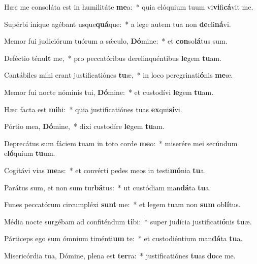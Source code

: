 \item Hæc me consoláta est in humilitáte \textbf{me}a:~* quia elóquium tuum vi\textbf{vi}fi\textbf{cá}vit me.
\item Supérbi iníque agébant usque\textbf{quá}que:~* a lege autem tua non \textbf{de}cli\textbf{ná}vi.
\item Memor fui judiciórum tuórum a sǽculo, \textbf{Dó}mine:~* et \textbf{con}so\textbf{lá}tus sum.
\item Deféctio ténu\textbf{it} me,~* pro peccatóribus derelinquéntibus \textbf{le}gem \textbf{tu}am.
\item Cantábiles mihi erant justificatiónes \textbf{tu}æ,~* in loco peregrinati\textbf{ó}nis \textbf{me}æ.
\item Memor fui nocte nóminis tui, \textbf{Dó}mine:~* et custodívi \textbf{le}gem \textbf{tu}am.
\item Hæc facta est \textbf{mi}hi:~* quia justificatiónes tuas \textbf{ex}qui\textbf{sí}vi.
\item Pórtio mea, \textbf{Dó}mine,~* dixi custodíre \textbf{le}gem \textbf{tu}am.
\item Deprecátus sum fáciem tuam in toto corde \textbf{me}o:~* miserére mei secúndum e\textbf{ló}quium \textbf{tu}um.
\item Cogitávi vias \textbf{me}as:~* et convérti pedes meos in testi\textbf{mó}nia \textbf{tu}a.
\item Parátus sum, et non sum tur\textbf{bá}tus:~* ut custódiam man\textbf{dá}ta \textbf{tu}a.
\item Funes peccatórum circumpléxi \textbf{sunt} me:~* et legem tuam non \textbf{sum} ob\textbf{lí}tus.
\item Média nocte surgébam ad confiténdum \textbf{ti}bi:~* super judícia justificati\textbf{ó}nis \textbf{tu}æ.
\item Párticeps ego sum ómnium timénti\textbf{um} te:~* et custodiéntium man\textbf{dá}ta \textbf{tu}a.
\item Misericórdia tua, Dómine, plena est \textbf{ter}ra:~* justificatiónes \textbf{tu}as \textbf{do}ce me.
